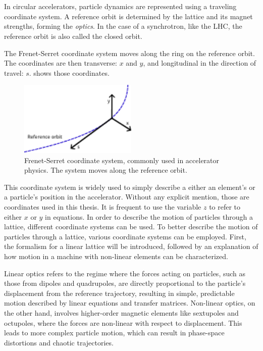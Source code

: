 \section{}

In circular accelerators, particle dynamics are represented using a traveling coordinate system.
A reference orbit is determined by the lattice and its magnet strengths, forming the
\textit{optics}. In the case of a synchrotron, like the LHC, the reference orbit is also called the
closed orbit.

The Frenet-Serret coordinate system moves along the ring on the reference orbit. The coordinates are
then transverse: $x$ and $y$, and longitudinal in the direction of travel: $s$.
 shows those coordinates.

\begin{figure}[H]
    \centering
    \includegraphics[width=0.5\textwidth]{images/frenet.pdf}
    \caption{Frenet-Serret coordinate system, commonly used in accelerator physics. The system moves
    along the reference orbit.}
    \label{fig:coordinate_systems:frenet_serret}
\end{figure}

This coordinate system is widely used to simply describe a either an element's or a particle's
position in the accelerator. Without any explicit mention, those are coordinates used in this
thesis. It is frequent to use the variable $z$ to refer to either $x$ or $y$ in equations.
In order to describe the motion of particles through a lattice, different coordinate systems can be
used. To better describe the motion of particles through a lattice, various coordinate systems can
be employed. First, the formalism for a linear lattice will be introduced, followed by an
explanation of how motion in a machine with non-linear elements can be characterized.

Linear optics refers to the regime where the forces acting on particles, such as those from dipoles
and quadrupoles, are directly proportional to the particle's displacement from the reference
trajectory, resulting in simple, predictable motion described by linear equations and transfer
matrices. Non-linear optics, on the other hand, involves higher-order magnetic elements like
sextupoles and octupoles, where the forces are non-linear with respect to displacement. This leads
to more complex particle motion, which can result in phase-space distortions and chaotic
trajectories.


